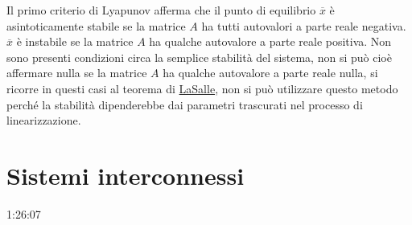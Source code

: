 Il primo criterio di Lyapunov afferma che il punto di equilibrio $\overline{x}$
è asintoticamente stabile se la matrice $A$ ha tutti autovalori a parte reale
negativa.
$\overline{x}$ è instabile se la matrice $A$ ha qualche autovalore a parte reale
positiva.
Non sono presenti condizioni circa la semplice stabilità del sistema, non si
può cioè affermare nulla se la matrice $A$ ha qualche autovalore a parte reale
nulla, si ricorre in questi casi al teorema di
\href{https://it.wikipedia.org/wiki/Teorema_di_LaSalle}{LaSalle}, non si può
utilizzare questo metodo perché la stabilità dipenderebbe dai parametri
trascurati nel processo di linearizzazione.

\newpage
\section{Sistemi interconnessi}
1:26:07
